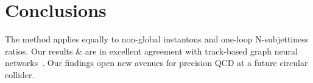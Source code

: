 \section{Conclusions}\label{sec:conclusions}

The method applies equally to non-global instantons and one-loop
N-subjettiness ratios. Our results & are in excellent agreement with
track-based graph neural
networks~\cite{TPC:0891-Sphalerons-from-Projected-Energy-Correlators-September-26-2026}.
Our findings open new avenues for precision QCD at a future circular
collider.

